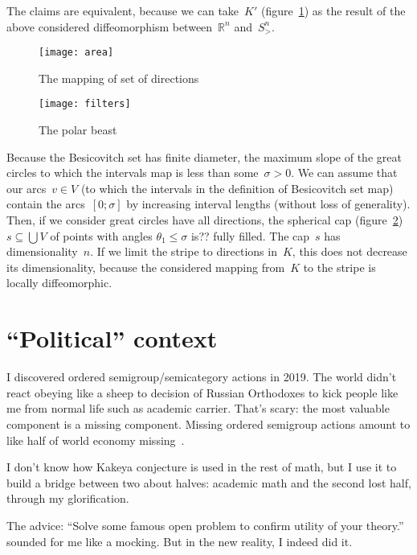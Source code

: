 \documentclass[oneside,draft]{amsart}
\begin{document}
The claims are equivalent, because we can take~$K'$ (figure~\ref{fig:area}) as the result of the above considered diffeomorphism between~$\mathbb{R}^n$ and~$S^n_{>}$.

\begin{figure}[hbt]
    \centering
    \texttt{[image: area]}
    \caption{The mapping of set of directions}
    \label{fig:area}
\end{figure}

\begin{figure}[hbt]
    \centering
    \texttt{[image: filters]}
    \caption{The polar beast}
    \label{fig:filters}
\end{figure}

Because the Besicovitch set has finite diameter, the maximum slope of the great circles to which the intervals map is less than some~$\sigma>0$. We can assume that our arcs~$v\in V$ (to which the intervals in the definition of Besicovitch set map) contain the arcs~$[0;\sigma]$ by increasing interval lengths (without loss of generality). Then, if we consider great circles have all directions, the spherical cap (figure~\ref{fig:filters}) $s\subseteq\bigcup V$ of points with angles $\theta_1\leq\sigma$ is?? fully filled. The cap~$s$ has dimensionality~$n$.
If we limit the stripe to directions in~$K$, this does not decrease its dimensionality, because the considered mapping from~$K$ to the stripe is locally diffeomorphic.

\section{``Political'' context}

I discovered ordered semigroup/semicategory actions in 2019. The world didn't react obeying like a sheep to decision of Russian Orthodoxes to kick people like me from normal life such as academic carrier. That's scary: the most valuable component is a missing component. Missing ordered semigroup actions amount to like half of world economy missing~\cite{osa-important}.

I don't know how Kakeya conjecture is used in the rest of math, but I use it to build a bridge between two about halves: academic math and the second lost half, through my glorification.

The advice: ``Solve some famous open problem to confirm utility of your theory.'' sounded for me like a mocking. But in the new reality, I indeed did it.



\end{document}
